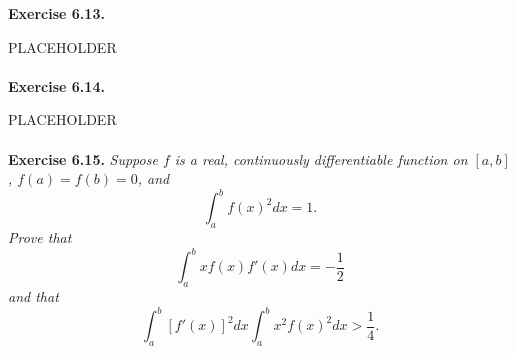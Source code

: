 \documentclass{article}
\begin{document}



\textbf{Exercise 6.13.}

PLACEHOLDER \\\\






\textbf{Exercise 6.14.}

PLACEHOLDER \\\\






\textbf{Exercise 6.15.}
\emph{Suppose $f$ is a real, continuously differentiable function on $[a,b]$,
$f(a)=f(b)=0$, and
\[
  \int_{a}^{b} f(x)^2 dx = 1.
\]
Prove that
\[
  \int_{a}^{b} xf(x)f'(x) dx = -\frac{1}{2}
\]
and that
\[
  \int_{a}^{b} [f'(x)]^2 dx \int_{a}^{b} x^2f(x)^2 dx > \frac{1}{4}.
\]
} \\
\end{document}

